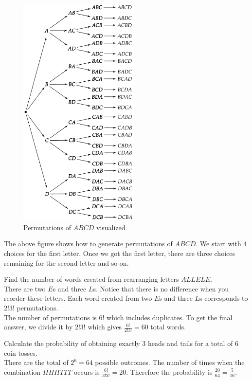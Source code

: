 \begin{figure}[H]
	\centering
	\includegraphics[width=60mm]{1.png}
	\caption{Permutations of $ABCD$ visualized}
\end{figure}

The above figure shows how to generate permutations of $ABCD$. We start with 4 choices for the first letter. Once we got the first letter, there are three choices remaining for the second letter and so on.

\begin{texample}
	Find the number of words created from rearranging letters $ALLELE$. \\
	
	There are two $E$s and three $L$s. Notice that there is no difference when you reorder these letters. Each word created from two $E$s and three $L$s corresponds to $2!3!$ permutations. \\
	
	The number of permutations is $6!$ which includes duplicates. To get the final answer, we divide it by $2!3!$ which gives $\frac{6!}{2!3!}=60$ total words.
\end{texample}

\begin{texample}
	Calculate the probability of obtaining exactly $3$ heads and tails for a total of 6 coin tosses. \\
	
	There are the total of $2^6=64$ possible outcomes. The number of times when the combination $HHHTTT$ occurs is $\frac{6!}{3!3!}=20$. Therefore the probability is $\frac{20}{64}=\frac{5}{16}$.
\end{texample}

